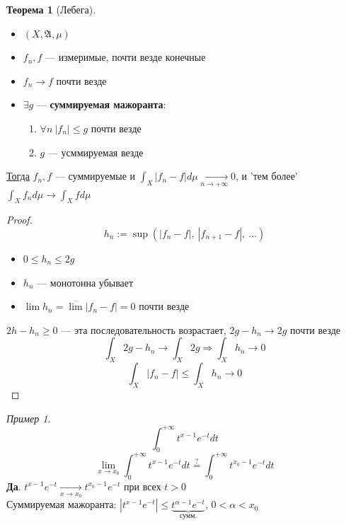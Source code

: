 \documentclass[oneside]{book}
\newcommand{\A}{\mathfrak{A}}
\theoremstyle{plain}
\theoremstyle{remark}
\newtheorem*{examp}{Пример}
\theoremstyle{definition}
\newtheorem{theorem}{Теорема}[section]
\begin{document}
\begin{theorem}[Лебега]
\-
\begin{itemize}
\item \((X, \A, \mu)\)
\item \(f_n, f\) --- измеримые, почти везде конечные
\item \(f_n \to f\) почти везде
\item \(\exists g\) --- \textbf{суммируемая мажоранта}:
\begin{enumerate}
\item \label{lebega_1} \(\forall n\ |f_n| \le g\) почти везде
\item \(g\) --- усммируемая везде
\end{enumerate}
\end{itemize}
\uline{Тогда} \(f_n, f\) --- суммируемые и \(\int_X |f_n - f|d\mu\xrightarrow[n \to + \infty]{}0\), и 'тем более' \(\int_X f_n d\mu \to \int_X f d\mu\)
\end{theorem}
\begin{proof}
\[ h_n := \sup(|f_n - f|,\ |f_{n + 1} - f|,\ \dots) \]
\begin{itemize}
\item \(0 \le h_n \le 2g\)
\item \(h_n\) --- монотонна убывает
\item \(\lim h_n = \overline{\lim}|f_n - f| = 0\) почти везде
\end{itemize}
\(2h - h_n \ge 0\) --- эта последовательность возрастает, \(2g - h_n \to 2g\) почти везде
\[ \int_X 2g - h_n \to \int_X 2g \Rightarrow \int_X h_n \to 0 \]
\[ \int_X|f_n -f| \le \int_X h_n \to 0 \]
\end{proof}
\begin{examp}
\[ \int_0^{ + \infty} t^{x - 1}e^{-t} dt \]
\[ \lim_{x \to x_0} \int_0^{ + \infty} t^{x - 1} e^{-t} dt \overset{?}{=} \int_0^{ + \infty}t^{x_0 - 1}e^{-t} dt\]
\textbf{Да}. \(t^{x - 1} e^{-t} \xrightarrow[x \to x_0]{} t^{x_0 - 1}e^{-t}\) при всех \(t>0\) \\
Суммируемая мажоранта: \(|t^{x - 1}e^{-t}| \le \underbrace{t^{\alpha - 1}e^{-t}}_\text{сумм.}\), \(0 < \alpha < x_0\)
\end{examp}
\end{document}
